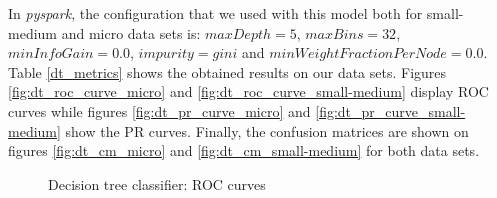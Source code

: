 \documentclass[LaM,binding=0.6cm, english]{sapthesis}
\begin{document}
In \textit{pyspark}, the configuration that we used with this model both for small-medium and micro data sets is: $maxDepth = 5$, $maxBins = 32$, $minInfoGain = 0.0$, $impurity = gini$ and $minWeightFractionPerNode = 0.0$. Table \ref{dt_metrics} shows the obtained results on our data sets. Figures \ref{fig:dt_roc_curve_micro} and \ref{fig:dt_roc_curve_small-medium} display ROC curves while figures \ref{fig:dt_pr_curve_micro} and \ref{fig:dt_pr_curve_small-medium} show the PR curves. Finally, the confusion matrices are shown on figures \ref{fig:dt_cm_micro} and \ref{fig:dt_cm_small-medium} for both data sets.
 
\begin{table}[!ht]
\centering
{}
\vspace{2mm}
\caption{Decision tree classifier metrics}
\label{dt_metrics}
\end{table}

\begin{figure}[!ht]
  \centering
  \hfill
  \caption{Decision tree classifier: ROC curves}
\end{figure}
\end{document}
